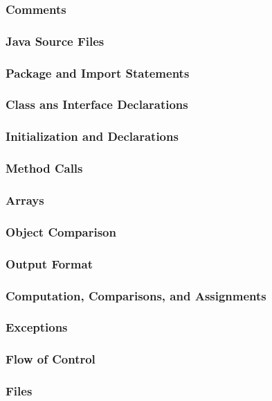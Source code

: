 \documentclass{article}
\begin{document}
  \subsubsection{Comments}
  \subsubsection{Java Source Files}
  \subsubsection{Package and Import Statements}
  \subsubsection{Class ans Interface Declarations}
  \subsubsection{Initialization and Declarations}
  \subsubsection{Method Calls}
  \subsubsection{Arrays}
  \subsubsection{Object Comparison}
  \subsubsection{Output Format}
  \subsubsection{Computation, Comparisons, and Assignments}
  \subsubsection{Exceptions}
  \subsubsection{Flow of Control}
  \subsubsection{Files}
\end{document}
